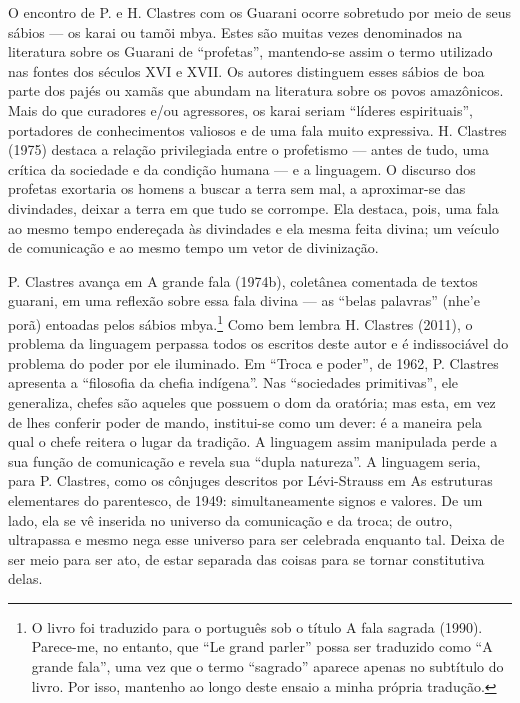 O encontro de P. e H. Clastres com os Guarani ocorre sobretudo por meio
de seus sábios — os karai ou tamõi mbya. Estes são muitas vezes
denominados na literatura sobre os Guarani de ``profetas'', mantendo-se
assim o termo utilizado nas fontes dos séculos XVI e XVII. Os autores
distinguem esses sábios de boa parte dos pajés ou xamãs que abundam na
literatura sobre os povos amazônicos. Mais do que curadores e/ou
agressores, os karai seriam ``líderes espirituais'', portadores de
conhecimentos valiosos e de uma fala muito expressiva. H. Clastres
(1975) destaca a relação privilegiada entre o profetismo — antes de
tudo, uma crítica da sociedade e da condição humana — e a linguagem. O
discurso dos profetas exortaria os homens a buscar a terra sem mal, a
aproximar-se das divindades, deixar a terra em que tudo se corrompe.
Ela destaca, pois, uma fala ao mesmo tempo endereçada às divindades e
ela mesma feita divina; um veículo de comunicação e ao mesmo tempo um
vetor de divinização.

P. Clastres avança em A grande fala (1974b), coletânea comentada de
textos guarani, em uma reflexão sobre essa fala divina — as ``belas
palavras'' (nhe’e porã) entoadas pelos sábios mbya.\footnote{O livro foi
traduzido para o português sob o título A fala sagrada (1990).
Parece-me, no entanto, que ``Le grand parler'' possa ser traduzido como
``A grande fala'', uma vez que o termo ``sagrado'' aparece apenas no
subtítulo do livro. Por isso, mantenho ao longo deste ensaio a minha
própria tradução.} Como bem lembra H. Clastres (2011), o problema da
linguagem perpassa todos os escritos deste autor e é indissociável do
problema do poder por ele iluminado. Em ``Troca e poder'', de 1962, P.
Clastres apresenta a ``filosofia da chefia indígena''. Nas ``sociedades
primitivas'', ele generaliza, chefes são aqueles que possuem o dom da
oratória; mas esta, em vez de lhes conferir poder de mando, institui-se
como um dever: é a maneira pela qual o chefe reitera o lugar da
tradição. A linguagem assim manipulada perde a sua função de
comunicação e revela sua ``dupla natureza''. A linguagem seria, para P.
Clastres, como os cônjuges descritos por Lévi-Strauss em As estruturas
elementares do parentesco, de 1949: simultaneamente signos e valores.
De um lado, ela se vê inserida no universo da comunicação e da troca;
de outro, ultrapassa e mesmo nega esse universo para ser celebrada
enquanto tal. Deixa de ser meio para ser ato, de estar separada das
coisas para se tornar constitutiva delas. 

